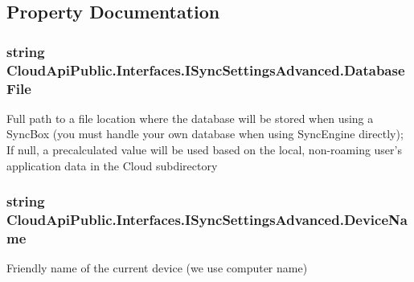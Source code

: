 \subsection{Property Documentation}
\hypertarget{interface_cloud_api_public_1_1_interfaces_1_1_i_sync_settings_advanced_a16054154b37da7455f410a3b8f074a27}{
\subsubsection[{Database\-File}]{\setlength{\rightskip}{0pt plus 5cm}string Cloud\-Api\-Public.\-Interfaces.\-I\-Sync\-Settings\-Advanced.\-Database\-File\hspace{0.3cm}{\ttfamily [get]}}}\label{interface_cloud_api_public_1_1_interfaces_1_1_i_sync_settings_advanced_a16054154b37da7455f410a3b8f074a27}


Full path to a file location where the database will be stored when using a Sync\-Box (you must handle your own database when using Sync\-Engine directly); If null, a precalculated value will be used based on the local, non-\/roaming user's application data in the Cloud subdirectory 

\hypertarget{interface_cloud_api_public_1_1_interfaces_1_1_i_sync_settings_advanced_a6c77d27d7e668673e0739f84d500e5f4}{
\subsubsection[{Device\-Name}]{\setlength{\rightskip}{0pt plus 5cm}string Cloud\-Api\-Public.\-Interfaces.\-I\-Sync\-Settings\-Advanced.\-Device\-Name\hspace{0.3cm}{\ttfamily [get]}}}\label{interface_cloud_api_public_1_1_interfaces_1_1_i_sync_settings_advanced_a6c77d27d7e668673e0739f84d500e5f4}


Friendly name of the current device (we use computer name) 

